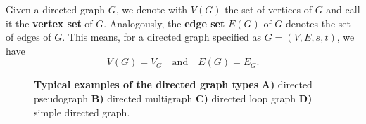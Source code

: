 
Given a directed graph $G$, we denote with $V(G)$ the set of vertices
of $G$ and call it the \textbf{vertex set} of $G$. Analogously, the
\textbf{edge set} $E(G)$ of $G$ denotes the set of edges of $G$. This
means, for a directed graph specified as $G = (V,E,s,t)$, we
have \[V(G) = V_G \quad \mathrm{and} \quad E(G) = E_G.\]

\begin{figure}[!htbp]
  \centering 
  \vfill
  \vspace{0.25cm}
    \caption{%
      \textbf{Typical examples of the directed graph types}
      \textbf{A)} directed pseudograph \textbf{B)} directed
      multigraph \textbf{C)} directed loop graph \textbf{D)} simple
      directed graph.} %
  \label{fig:directed_graph_types}
\end{figure}






